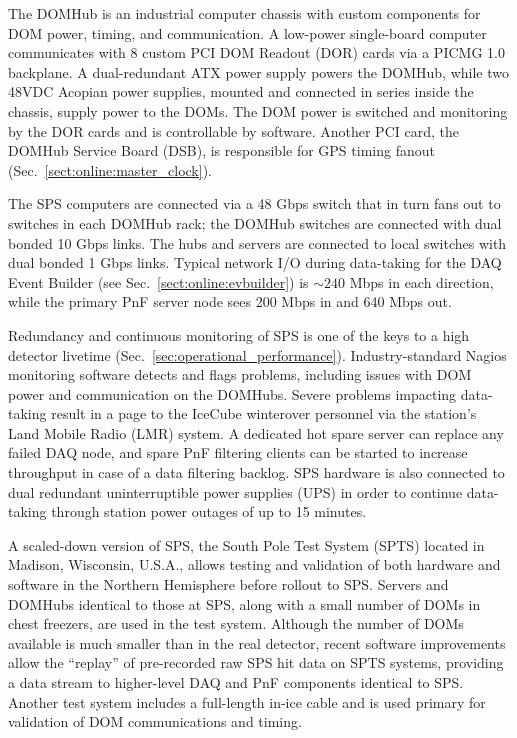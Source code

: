 The DOMHub is an industrial computer chassis with custom components for DOM
power, timing, and communication.  A low-power single-board computer
communicates with 8 custom PCI DOM Readout (DOR) cards via a PICMG 1.0
backplane.  A dual-redundant ATX power supply powers the DOMHub, while two
48VDC Acopian power supplies, mounted and connected in series inside the
chassis, supply power to the DOMs.  The DOM power is switched and
monitoring by the DOR cards and is controllable by software.  Another PCI
card, the DOMHub Service Board (DSB), is responsible for GPS timing fanout
(Sec.~\ref{sect:online:master_clock}).

The SPS computers are connected via a 48 Gbps switch that in turn fans out
to switches in each DOMHub rack; the DOMHub switches are connected with
dual bonded 10 Gbps links.  The hubs and servers are connected to local
switches with dual bonded 1 Gbps links.  Typical network I/O during
data-taking for the DAQ Event Builder (see
Sec.~\ref{sect:online:evbuilder}) is $\sim240$ Mbps in each direction, while
the primary PnF server node sees 200 Mbps in and 640 Mbps out.

Redundancy and continuous monitoring of SPS is one of the keys to a high
detector livetime (Sec.~\ref{sec:operational_performance}).
Industry-standard Nagios monitoring software detects and flags problems, 
including issues with DOM power and communication on the DOMHubs.  Severe
problems impacting data-taking result in a page to the IceCube winterover 
personnel via the station's Land Mobile Radio (LMR) system.  A dedicated
hot spare server can replace any failed DAQ node, and spare PnF filtering
clients can be started to increase throughput in case of a data filtering
backlog.  SPS hardware is also connected to dual redundant uninterruptible
power supplies (UPS) in order to continue data-taking through station power
outages of up to 15 minutes.

A scaled-down version of SPS, the South Pole Test System (SPTS) located in
Madison, Wisconsin, U.S.A., allows testing and validation of both hardware
and software in the Northern Hemisphere before rollout to SPS.  Servers and DOMHubs
identical to those at SPS, along with a small number of DOMs in chest
freezers, are used in the test system.  Although the number of DOMs
available is much smaller than in the real detector, recent software
improvements allow the ``replay'' of pre-recorded raw SPS hit data
on SPTS systems, providing a data stream to higher-level DAQ and PnF
components identical to SPS.  Another test system includes a full-length
in-ice cable and is used primary for validation of DOM communications and
timing.

